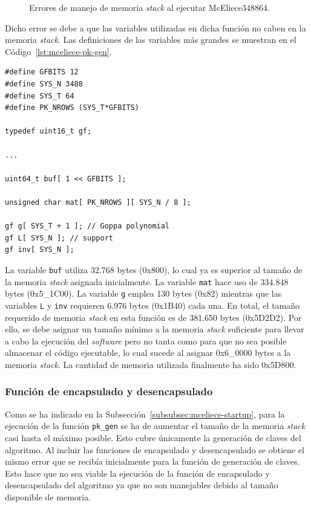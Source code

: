 \begin{figure}[h]
\begin{subfigure}[b]{0.3\textwidth}
    \end{subfigure}
       \caption{Errores de manejo de memoria \textit{stack} al ejecutar McEliece348864.}
       \label{fig:mceliece-error}
\end{figure}

Dicho error se debe a que las variables utilizadas en dicha función no caben en la memoria \textit{stack}.
Las definiciones de las variables más grandes se muestran en el Código~\ref{lst:mceliece-pk-gen}.

\begin{lstlisting}[label={lst:mceliece-pk-gen},style=Cnice,firstnumber=1,caption={Variables en la función \texttt{pk\_gen}.}]
#define GFBITS 12
#define SYS_N 3488
#define SYS_T 64
#define PK_NROWS (SYS_T*GFBITS)

typedef uint16_t gf;

...

uint64_t buf[ 1 << GFBITS ];

unsigned char mat[ PK_NROWS ][ SYS_N / 8 ];

gf g[ SYS_T + 1 ]; // Goppa polynomial
gf L[ SYS_N ]; // support
gf inv[ SYS_N ];
\end{lstlisting}

La variable \texttt{buf} utiliza 32.768 bytes (0x800), lo cual ya es superior al tamaño de la memoria \textit{stack} asignada inicialmente.
La variable \texttt{mat} hace uso de 334.848 bytes (0x5\_1C00).
La variable \texttt{g} emplea 130 bytes (0x82) mientras que las variables \texttt{L} y \texttt{inv} requieren 6.976 bytes (0x1B40) cada una.
En total, el tamaño requerido de memoria \textit{stack} en esta función es de 381.650 bytes (0x5D2D2).
Por ello, se debe asignar un tamaño mínimo a la memoria \textit{stack} suficiente para llevar a cabo la ejecución del \textit{software} pero no tanta como para que no sea posible almacenar el código ejecutable, lo cual sucede al asignar 0x6\_0000 bytes a la memoria \textit{stack}.
La cantidad de memoria utilizada finalmente ha sido 0x5D800.


\subsubsection{Función de encapsulado y desencapsulado}\label{subsubsec:mceliece-dec-enc}

Como se ha indicado en la Subsección~\ref{subsubsec:mceliece-startup}, para la ejecución de la función \texttt{pk\_gen} se ha de aumentar el tamaño de la memoria \textit{stack} casi hasta el máximo posible.
Esto cubre únicamente la generación de claves del algoritmo.
Al incluir las funciones de encapsulado y desencapsulado se obtiene el mismo error que se recibía inicialmente para la función de generación de claves.
Esto hace que no sea viable la ejecución de la función de encapsulado y desencapsulado del algoritmo ya que no son manejables debido al tamaño disponible de memoria.


